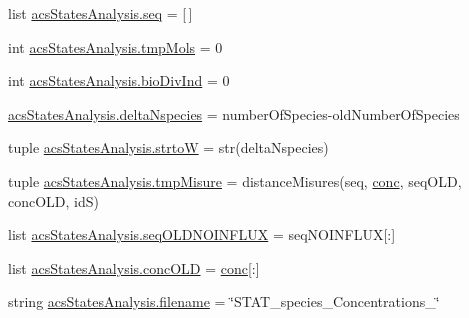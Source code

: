 \begin{DoxyCompactItemize}
\item 
list \hyperlink{a00132_a22eec19fcd0da474a136cfe97438ae3b}{acs\+States\+Analysis.\+seq} = \mbox{[}$\,$\mbox{]}
\item 
int \hyperlink{a00132_aa24f8efad70335a8460f68902001ce64}{acs\+States\+Analysis.\+tmp\+Mols} = 0
\item 
int \hyperlink{a00132_a247328d05f06695b0c2de9a001ca4548}{acs\+States\+Analysis.\+bio\+Div\+Ind} = 0
\item 
\hyperlink{a00132_a555117703c3245ec7d3d73f5d991c8c5}{acs\+States\+Analysis.\+delta\+Nspecies} = number\+Of\+Species-\/old\+Number\+Of\+Species
\item 
tuple \hyperlink{a00132_abe05028c33fab522e3b940195eaaa586}{acs\+States\+Analysis.\+strto\+W} = str(delta\+Nspecies)
\item 
tuple \hyperlink{a00132_a45529ce20ca353ca8ac251b4e88c91ff}{acs\+States\+Analysis.\+tmp\+Misure} = distance\+Misures(seq, \hyperlink{a00027_a941dee33725f074478fdcbf15e1c35ae}{conc}, seq\+O\+L\+D, conc\+O\+L\+D, id\+S)
\item 
list \hyperlink{a00132_ac796dfff897c2b81d04e71e4f3306d16}{acs\+States\+Analysis.\+seq\+O\+L\+D\+N\+O\+I\+N\+F\+L\+U\+X} = seq\+N\+O\+I\+N\+F\+L\+U\+X\mbox{[}\+:\mbox{]}
\item 
list \hyperlink{a00132_a15f99c617a2dc95e52f741ee99e71b7a}{acs\+States\+Analysis.\+conc\+O\+L\+D} = \hyperlink{a00027_a941dee33725f074478fdcbf15e1c35ae}{conc}\mbox{[}\+:\mbox{]}
\item 
string \hyperlink{a00132_a69b59a10e5dc62a6e0d5325e9a27e5c6}{acs\+States\+Analysis.\+filename} = \char`\"{}S\+T\+A\+T\+\_\+species\+\_\+\+Concentrations\+\_\+\char`\"{}
\end{DoxyCompactItemize}
